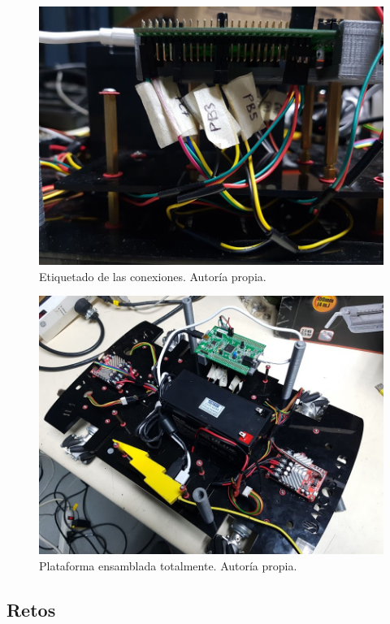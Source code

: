 \begin{figure}[H]
\centering
\includegraphics[scale=0.35]{imagenes/ensamble2.jpg}
\caption{Etiquetado de las conexiones. Autoría propia.}
\label{F:ensamble3}
\end{figure}

\begin{figure}[H]
\centering
\includegraphics[scale=0.35]{imagenes/ensamble1.jpg}
\caption{Plataforma ensamblada totalmente. Autoría propia.}
\label{F:ensamble4}
\end{figure}

\subsection{Retos}

